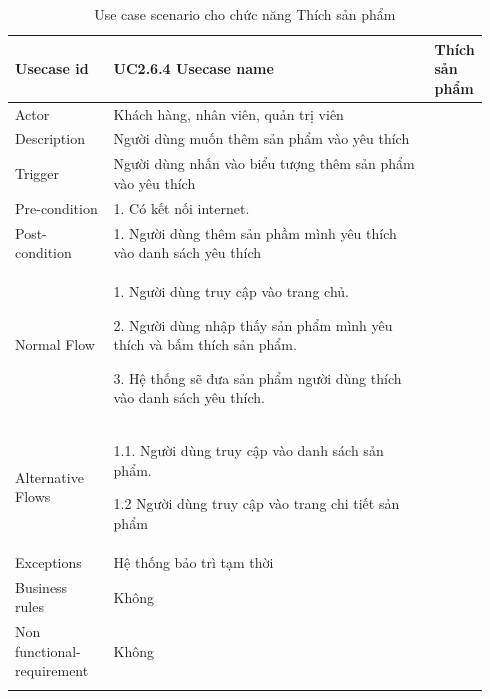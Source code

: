 \begin{longtable}{|>{\hspace{0pt}}m{0.213\linewidth}|>{\hspace{0pt}}m{0.729\linewidth}|} 
\hline
Usecase id & UC2.6.4 \endfirsthead 
\hline
Usecase name & Thích sản phẩm \\ 
\hline
Actor & Khách hàng, nhân viên, quản trị viên \\ 
\hline
Description & Người dùng muốn thêm sản phẩm vào yêu thích\\ 
\hline
Trigger & Người dùng nhấn vào biểu tượng thêm sản phẩm vào yêu thích \\ 
\hline
Pre-condition & 1. Có kết nối internet. \\ 
\hline
Post-condition & 1. Người dùng thêm sản phầm mình yêu thích vào danh sách yêu thích \\ 
\hline
Normal Flow & 1. Người dùng truy cập vào trang chủ.\par{}2. Người dùng nhập thấy sản phẩm mình yêu thích và bấm thích sản phẩm.\par{}3. Hệ thống sẽ đưa sản phẩm người dùng thích vào danh sách yêu thích. \\ 
\hline
Alternative Flows & 1.1. Người dùng truy cập vào danh sách sản phẩm.\par{} 1.2 Người dùng truy cập vào trang chi tiết sản phẩm \\ 
\hline
Exceptions & Hệ thống bảo trì tạm thời \\ 
\hline
Business rules & Không \\ 
\hline
Non functional-requirement & Không \\ 
\hline
\caption{Use case scenario cho chức năng Thích sản phẩm}
\end{longtable}


